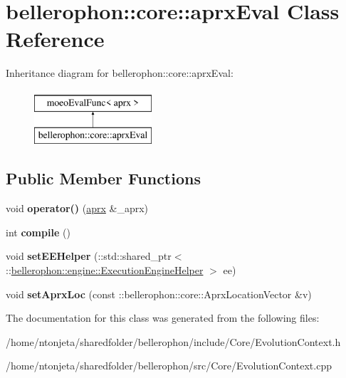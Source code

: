 \hypertarget{classbellerophon_1_1core_1_1aprxEval}{}\section{bellerophon\+:\+:core\+:\+:aprx\+Eval Class Reference}
\label{classbellerophon_1_1core_1_1aprxEval}
Inheritance diagram for bellerophon\+:\+:core\+:\+:aprx\+Eval\+:\begin{figure}[H]
\begin{center}
\leavevmode
\includegraphics[height=2.000000cm]{classbellerophon_1_1core_1_1aprxEval}
\end{center}
\end{figure}
\subsection*{Public Member Functions}
\begin{DoxyCompactItemize}
\item 
\hypertarget{classbellerophon_1_1core_1_1aprxEval_abedbf814aa36df17b697246584f9e4b7}{}\label{classbellerophon_1_1core_1_1aprxEval_abedbf814aa36df17b697246584f9e4b7} 
void {\bfseries operator()} (\hyperlink{classbellerophon_1_1core_1_1aprx}{aprx} \&\+\_\+aprx)
\item 
\hypertarget{classbellerophon_1_1core_1_1aprxEval_a60bcda54bf5c58b5418d4560a30bdd48}{}\label{classbellerophon_1_1core_1_1aprxEval_a60bcda54bf5c58b5418d4560a30bdd48} 
int {\bfseries compile} ()
\item 
\hypertarget{classbellerophon_1_1core_1_1aprxEval_ad181047fea8b5b32e16786610c66de54}{}\label{classbellerophon_1_1core_1_1aprxEval_ad181047fea8b5b32e16786610c66de54} 
void {\bfseries set\+E\+E\+Helper} (\+::std\+::shared\+\_\+ptr$<$\+::\hyperlink{classbellerophon_1_1engine_1_1ExecutionEngineHelper}{bellerophon\+::engine\+::\+Execution\+Engine\+Helper} $>$ ee)
\item 
\hypertarget{classbellerophon_1_1core_1_1aprxEval_a6b4089083c46432709f42da00c5a10a1}{}\label{classbellerophon_1_1core_1_1aprxEval_a6b4089083c46432709f42da00c5a10a1} 
void {\bfseries set\+Aprx\+Loc} (const \+::bellerophon\+::core\+::\+Aprx\+Location\+Vector \&v)
\end{DoxyCompactItemize}


The documentation for this class was generated from the following files\+:\begin{DoxyCompactItemize}
\item 
/home/ntonjeta/sharedfolder/bellerophon/include/\+Core/Evolution\+Context.\+h\item 
/home/ntonjeta/sharedfolder/bellerophon/src/\+Core/Evolution\+Context.\+cpp\end{DoxyCompactItemize}
